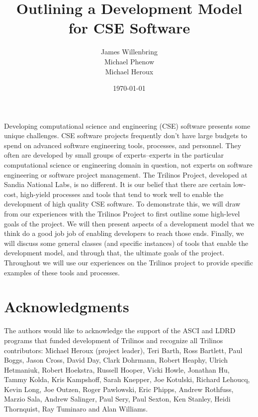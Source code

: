 \documentclass[12pt,relax]{article}
\title{Outlining a Development Model for CSE Software}
\author{
James Willenbring\\
Michael Phenow\\
Michael Heroux\\
}
\date{\today} %
\begin{document}
\maketitle



Developing computational science and engineering (CSE) software presents some 
unique challenges.  CSE software projects frequently don't have large budgets 
to spend on advanced software engineering tools, processes, and personnel.  
They often are developed by small groups of experts--experts in the particular 
computational science or engineering domain in question, not experts on 
software engineering or software project management.  The Trilinos Project,
developed at Sandia National Labs, is no different.  It is our belief that 
there are certain low-cost, high-yield processes and tools that tend to work 
well to enable the development of high quality CSE software.  To demonstrate 
this, we will draw from our experiences with the Trilinos Project to first
outline some high-level goals of the project.  We will then present aspects of
a development model that we think do a good job job of enabling developers to
reach those ends.  Finally, we will discuss some general classes (and specific
instances) of tools that enable the development model, and through that, 
the ultimate goals of the project.  Throughout we will use our experiences on 
the Trilinos project to provide specific examples of these tools and processes.


\clearpage


\section*{Acknowledgments}

The authors would like to acknowledge the support of the ASCI and LDRD programs 
that funded development of Trilinos and recognize all Trilinos contributors:
Michael Heroux (project leader), Teri Barth, Ross Bartlett, Paul Boggs, Jason
Cross, David Day, Clark Dohrmann, Robert Heaphy, Ulrich Hetmaniuk, Robert
Hoekstra, Russell Hooper, Vicki Howle, Jonathan Hu, Tammy Kolda, Kris
Kampshoff, Sarah Knepper, Joe Kotulski, Richard Lehoucq, Kevin Long, Joe
Outzen, Roger Pawlowski, Eric Phipps, Andrew Rothfuss, Marzio Sala, Andrew
Salinger, Paul Sery, Paul Sexton, Ken Stanley, Heidi Thornquist, Ray Tuminaro
and Alan Williams.
\end{document}
